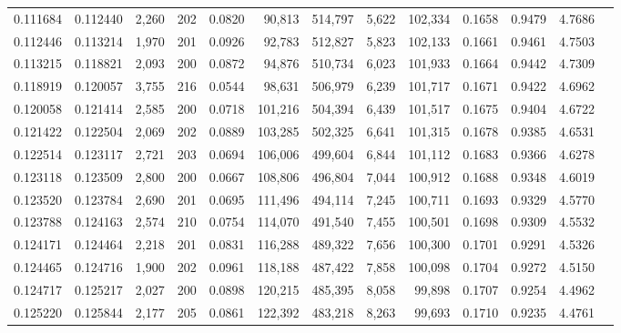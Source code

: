 \begin{tabular}{rrrrrrrrrrrrr}
0.111684 & 0.112440 & 2,260 & 202 &                                     0.0820 &  90,813 & 514,797 &   5,622 & 102,334 & 0.1658 & 0.9479 & 4.7686 \\
0.112446 & 0.113214 & 1,970 & 201 &                                     0.0926 &  92,783 & 512,827 &   5,823 & 102,133 & 0.1661 & 0.9461 & 4.7503 \\
0.113215 & 0.118821 & 2,093 & 200 &                                     0.0872 &  94,876 & 510,734 &   6,023 & 101,933 & 0.1664 & 0.9442 & 4.7309 \\
0.118919 & 0.120057 & 3,755 & 216 &                                     0.0544 &  98,631 & 506,979 &   6,239 & 101,717 & 0.1671 & 0.9422 & 4.6962 \\
0.120058 & 0.121414 & 2,585 & 200 &                                     0.0718 & 101,216 & 504,394 &   6,439 & 101,517 & 0.1675 & 0.9404 & 4.6722 \\
0.121422 & 0.122504 & 2,069 & 202 &                                     0.0889 & 103,285 & 502,325 &   6,641 & 101,315 & 0.1678 & 0.9385 & 4.6531 \\
0.122514 & 0.123117 & 2,721 & 203 &                                     0.0694 & 106,006 & 499,604 &   6,844 & 101,112 & 0.1683 & 0.9366 & 4.6278 \\
0.123118 & 0.123509 & 2,800 & 200 &                                     0.0667 & 108,806 & 496,804 &   7,044 & 100,912 & 0.1688 & 0.9348 & 4.6019 \\
0.123520 & 0.123784 & 2,690 & 201 &                                     0.0695 & 111,496 & 494,114 &   7,245 & 100,711 & 0.1693 & 0.9329 & 4.5770 \\
0.123788 & 0.124163 & 2,574 & 210 &                                     0.0754 & 114,070 & 491,540 &   7,455 & 100,501 & 0.1698 & 0.9309 & 4.5532 \\
0.124171 & 0.124464 & 2,218 & 201 &                                     0.0831 & 116,288 & 489,322 &   7,656 & 100,300 & 0.1701 & 0.9291 & 4.5326 \\
0.124465 & 0.124716 & 1,900 & 202 &                                     0.0961 & 118,188 & 487,422 &   7,858 & 100,098 & 0.1704 & 0.9272 & 4.5150 \\
0.124717 & 0.125217 & 2,027 & 200 &                                     0.0898 & 120,215 & 485,395 &   8,058 &  99,898 & 0.1707 & 0.9254 & 4.4962 \\
0.125220 & 0.125844 & 2,177 & 205 &                                     0.0861 & 122,392 & 483,218 &   8,263 &  99,693 & 0.1710 & 0.9235 & 4.4761 \\

\end{tabular}
